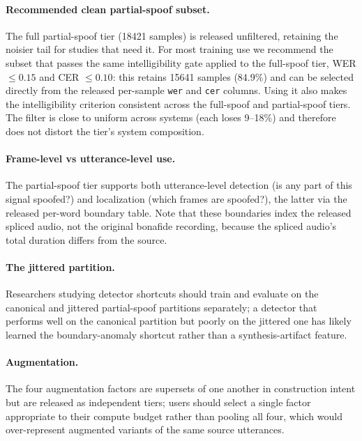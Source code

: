 \documentclass[11pt]{article}
\begin{document}
\paragraph{Recommended clean partial-spoof subset.} The full partial-spoof
tier (18421 samples) is released unfiltered, retaining the noisier
tail for studies that need it. For most training use we recommend the
subset that passes the same intelligibility gate applied to the
full-spoof tier, WER $\leq 0.15$ and CER $\leq 0.10$: this retains
15641 samples (84.9\%) and can be selected directly from the released
per-sample \texttt{wer} and \texttt{cer} columns. Using it also makes the
intelligibility criterion consistent across the full-spoof and
partial-spoof tiers. The filter is close to uniform across systems
(each loses 9--18\%) and therefore does not distort the tier's system
composition.

\paragraph{Frame-level vs utterance-level use.} The partial-spoof tier
supports both utterance-level detection (is any part of this signal
spoofed?) and localization (which frames are spoofed?), the latter via
the released per-word boundary table. Note that these boundaries index
the released spliced audio, not the original bonafide recording, because
the spliced audio's total duration differs from the source.

\paragraph{The jittered partition.} Researchers studying detector
shortcuts should train and evaluate on the canonical and jittered
partial-spoof partitions separately; a detector that performs well on the
canonical partition but poorly on the jittered one has likely learned the
boundary-anomaly shortcut rather than a synthesis-artifact feature.

\paragraph{Augmentation.} The four augmentation factors are supersets of
one another in construction intent but are released as independent tiers;
users should select a single factor appropriate to their compute budget
rather than pooling all four, which would over-represent augmented
variants of the same source utterances.
\end{document}
